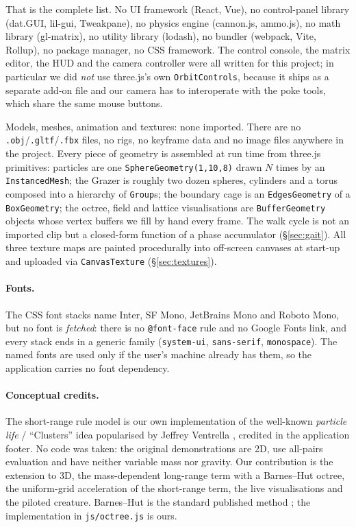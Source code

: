 \documentclass[10pt,a4paper]{article}
\newcommand{\code}[1]{\texttt{\small #1}}
\newcommand{\file}[1]{\texttt{\small\color{accent!70!black}#1}}
\begin{document}
That is the complete list. No UI framework (React, Vue), no control-panel library (dat.GUI, lil-gui,
Tweakpane), no physics engine (cannon.js, ammo.js), no math library (gl-matrix), no utility library
(lodash), no bundler (webpack, Vite, Rollup), no package manager, no CSS framework. The control console,
the matrix editor, the HUD and the camera controller were all written for this project; in particular we
did \emph{not} use three.js's own \code{OrbitControls}, because it ships as a separate add-on file and our
camera has to interoperate with the poke tools, which share the same mouse buttons.

\begin{notebox}{Models, meshes, animation and textures: none imported.}
There are no \code{.obj}/\code{.gltf}/\code{.fbx} files, no rigs, no keyframe data and no image files
anywhere in the project. Every piece of geometry is assembled at run time from three.js primitives:
particles are one \code{SphereGeometry(1,10,8)} drawn $N$ times by an \code{InstancedMesh}; the Grazer is
roughly two dozen spheres, cylinders and a torus composed into a hierarchy of \code{Group}s; the boundary
cage is an \code{EdgesGeometry} of a \code{BoxGeometry}; the octree, field and lattice visualisations are
\code{BufferGeometry} objects whose vertex buffers we fill by hand every frame. The walk cycle is not an
imported clip but a closed-form function of a phase accumulator (\S\ref{sec:gait}). All three texture maps
are painted procedurally into off-screen canvases at start-up and uploaded via \code{CanvasTexture}
(\S\ref{sec:textures}).
\end{notebox}

\paragraph{Fonts.} The CSS font stacks name Inter, SF Mono, JetBrains Mono and Roboto Mono, but no font is
\emph{fetched}: there is no \code{@font-face} rule and no Google Fonts link, and every stack ends in a
generic family (\code{system-ui}, \code{sans-serif}, \code{monospace}). The named fonts are used only if
the user's machine already has them, so the application carries no font dependency.

\paragraph{Conceptual credits.} The short-range rule model is our own implementation of the well-known
\emph{particle life} / ``Clusters'' idea popularised by Jeffrey Ventrella \cite{ventrella}, credited in the
application footer. No code was taken: the original demonstrations are 2D, use all-pairs evaluation and
have neither variable mass nor gravity. Our contribution is the extension to 3D, the mass-dependent
long-range term with a Barnes--Hut octree, the uniform-grid acceleration of the short-range term, the live
visualisations and the piloted creature. Barnes--Hut is the standard published method \cite{barneshut};
the implementation in \file{js/octree.js} is ours.
\end{document}
